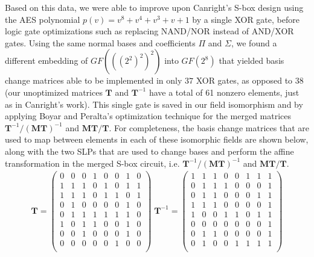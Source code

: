 Based on this data, we were able to improve upon Canright's S-box design using the AES polynomial $p(v) = v^8 + v^4 + v^3 + v + 1$ by a single XOR gate, before logic gate optimizations such as replacing NAND/NOR instead of AND/XOR gates. Using the same normal bases and coefficients $\Pi$ and $\Sigma$, we found a different embedding of $GF(((2^2)^2)^2)$ into $GF(2^8)$ that yielded basis change matrices able to be implemented in only $37$ XOR gates, as opposed to $38$ (our unoptimized matrices $\mathbf{T}$ and $\mathbf{T}^{-1}$ have a total of 61 nonzero elements, just as in Canright's work). This single gate is saved in our field isomorphism and by applying Boyar and Peralta's optimization technique for the merged matrices $\mathbf{T}^{-1} / (\mathbf{MT})^{-1}$ and $\mathbf{MT} / \mathbf{T}$. For completeness, the basis change matrices that are used to map between elements in each of these isomorphic fields are shown below, along with the two SLPs that are used to change bases and perform the affine transformation in the merged S-box circuit, i.e. $\mathbf{T}^{-1} / (\mathbf{MT})^{-1}$ and $\mathbf{MT} / \mathbf{T}$.
\begin{align*}
\mathbf{T} = 
\begin{pmatrix}
0 & 0 & 0 & 1 & 0 & 0 & 1 & 0 \\
1 & 1 & 1 & 0 & 1 & 0 & 1 & 1 \\
1 & 1 & 1 & 0 & 1 & 1 & 0 & 1 \\
0 & 1 & 0 & 0 & 0 & 0 & 1 & 0 \\
0 & 1 & 1 & 1 & 1 & 1 & 1 & 0 \\
1 & 0 & 1 & 1 & 0 & 0 & 1 & 0 \\
0 & 0 & 1 & 0 & 0 & 0 & 1 & 0 \\
0 & 0 & 0 & 0 & 0 & 1 & 0 & 0 \\
\end{pmatrix}
\;
\mathbf{T}^{-1} = 
\begin{pmatrix}
1 & 1 & 1 & 0 & 0 & 1 & 1 & 1 \\
0 & 1 & 1 & 1 & 0 & 0 & 0 & 1 \\
0 & 1 & 1 & 0 & 0 & 0 & 1 & 1 \\
1 & 1 & 1 & 0 & 0 & 0 & 0 & 1 \\
1 & 0 & 0 & 1 & 1 & 0 & 1 & 1 \\
0 & 0 & 0 & 0 & 0 & 0 & 0 & 1 \\
0 & 1 & 1 & 0 & 0 & 0 & 0 & 1 \\
0 & 1 & 0 & 0 & 1 & 1 & 1 & 1 \\
\end{pmatrix}
\end{align*}

